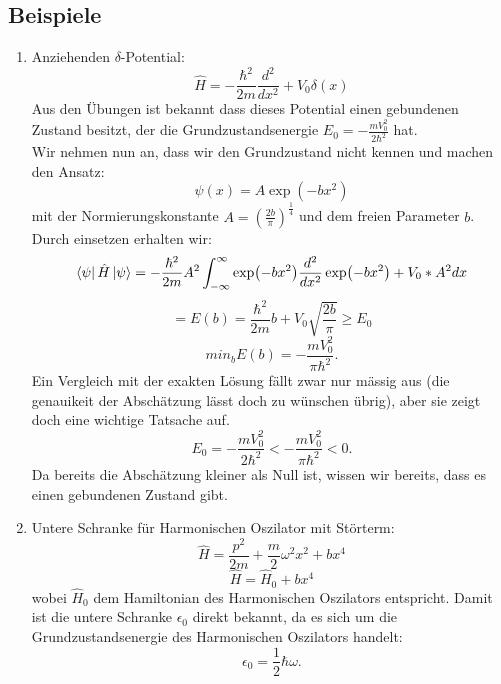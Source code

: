 \documentclass{report}
\begin{document}
\subsection{Beispiele}
\begin{enumerate}
	\item Anziehenden $\delta$-Potential:  \[
			\hat{H} = -\frac{\hbar^2}{2m} \frac{d^2}{dx^2} + V_0 \delta(x)
	\] Aus den Übungen ist bekannt dass dieses Potential einen gebundenen Zustand besitzt, der die Grundzustandsenergie $E_0 = - \frac{mV_0^2}{2\hbar^2}$ hat. \\
	Wir nehmen nun an, dass wir den Grundzustand nicht kennen und machen den Ansatz:  \[
		\psi(x) = A \exp(-bx^2) 
	\] mit der Normierungskonstante $A = (\frac{2b}{\pi})^\frac{1}{4}$ und dem freien Parameter $b$. Durch einsetzen erhalten wir:  \[
	\bra{\psi} \hat{H} \ket{\psi} = - \frac{\hbar^2}{2m} A^2 \int_{-\infty}^\infty \exp(-bx^2) \frac{d^2}{dx^2} \exp(-bx^2) + V_0*A^2 dx
	\] \[
	= E(b) = \frac{\hbar^2}{2m} b + V_0 \sqrt{\frac{2b}{\pi}} \ge E_0
	\] \[
	min_b E(b) = - \frac{mV_0^2}{\pi \hbar^2}
.\] Ein Vergleich mit der exakten Lösung fällt zwar nur mässig aus (die genauikeit der Abschätzung lässt doch zu wünschen übrig), aber sie zeigt doch eine wichtige Tatsache auf. \[
E_0 = - \frac{mV_0^2}{2 \hbar^2} < - \frac{mV_0^2}{\pi \hbar^2} < 0
.\] Da bereits die Abschätzung kleiner als Null ist, wissen wir bereits, dass es einen gebundenen Zustand gibt.   
	\item Untere Schranke für Harmonischen Oszilator mit Störterm: \\
		\[
		\hat{H} = \frac{p^2}{2m} + \frac{m}{2} \omega^2x^2 + bx^4
		\] \[
		\hat{H} = \hat{H}_0 + bx^4
		\] wobei $\hat{H}_0$ dem Hamiltonian des Harmonischen Oszilators entspricht. Damit ist die untere Schranke $\epsilon_0$ direkt bekannt, da es sich um die Grundzustandsenergie des Harmonischen Oszilators handelt: \[
		\epsilon_0 = \frac{1}{2} \hbar \omega
		.\]    
\end{enumerate}
\end{document}
